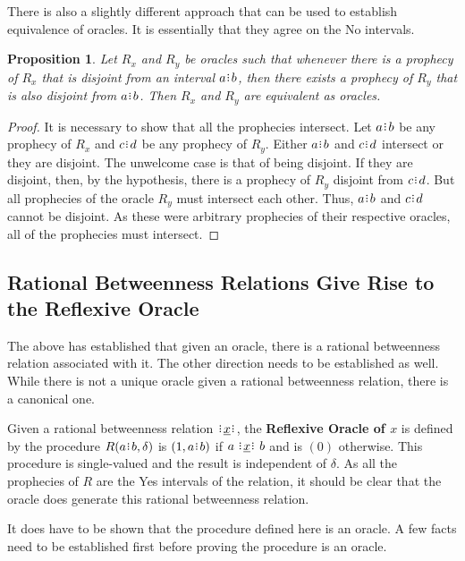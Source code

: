\documentclass[12pt]{article}
\newtheorem{proposition}{Proposition}[section]
\begin{document}
There is also a slightly different approach that can be used to establish equivalence of oracles. It is essentially that they agree on the No intervals. 

\begin{proposition}
    Let $R_x$ and $R_y$ be oracles such that whenever there is a prophecy of $R_x$ that is disjoint from an interval $a\rint b$, then there exists a prophecy of $R_y$ that is also disjoint from $a\rint b$. Then $R_x$ and $R_y$ are equivalent as oracles. 
\end{proposition}

\begin{proof}
    It is necessary to show that all the prophecies intersect. Let $a\rint b$ be any prophecy of $R_x$ and $c\rint d$ be any prophecy of $R_y$. Either $a\rint b$ and $c\rint d$ intersect or they are disjoint. The unwelcome case is that of being disjoint. If they are disjoint, then, by the hypothesis, there is a prophecy of $R_y$ disjoint from $c\rint d$. But all prophecies of the oracle $R_y$ must intersect each other. Thus,  $a\rint b$ and $c\rint d$ cannot be disjoint. As these were arbitrary prophecies of their respective oracles, all of the prophecies must intersect. 
\end{proof}



\subsection{Rational Betweenness Relations Give Rise to the Reflexive Oracle}

The above has established that given an oracle, there is a rational betweenness relation associated with it. The other direction needs to be established as well. While there is not a unique oracle given a rational betweenness relation, there is a canonical one. 

Given a rational betweenness relation $\xrel$, the \textbf{Reflexive Oracle of $x$} is defined by the procedure $R(a\rint b, \delta)$ is $(1, a\rint b)$ if $a \xrel b$ and is $(0)$ otherwise. This procedure is single-valued and the result is independent of $\delta$. As all the prophecies of $R$ are the Yes intervals of the relation, it should be clear that the oracle does generate this rational betweenness relation. 

It does have to be shown that the procedure defined here is an oracle. A few facts need to be established first before proving the procedure is an oracle. 
\end{document}
